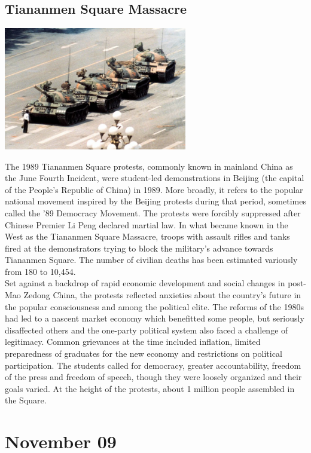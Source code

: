 \documentclass[11pt]{report}
\begin{document}
\subsection{Tiananmen Square Massacre}
\vspace{2mm}\begin{center}\includegraphics[width=8cm]{./img/tiananmenMassacre.jpg}\end{center}
The 1989 Tiananmen Square protests, commonly known in mainland China as the June Fourth Incident, were student-led demonstrations in Beijing (the capital of the People's Republic of China) in 1989. More broadly, it refers to the popular national movement inspired by the Beijing protests during that period, sometimes called the '89 Democracy Movement. The protests were forcibly suppressed after Chinese Premier Li Peng declared martial law. In what became known in the West as the Tiananmen Square Massacre, troops with assault rifles and tanks fired at the demonstrators trying to block the military's advance towards Tiananmen Square. The number of civilian deaths has been estimated variously from 180 to 10,454.\\
\indent Set against a backdrop of rapid economic development and social changes in post-Mao Zedong China, the protests reflected anxieties about the country's future in the popular consciousness and among the political elite. The reforms of the 1980s had led to a nascent market economy which benefitted some people, but seriously disaffected others and the one-party political system also faced a challenge of legitimacy. Common grievances at the time included inflation, limited preparedness of graduates for the new economy and restrictions on political participation. The students called for democracy, greater accountability, freedom of the press and freedom of speech, though they were loosely organized and their goals varied. At the height of the protests, about 1 million people assembled in the Square.
\section{November 09}
\end{document}
